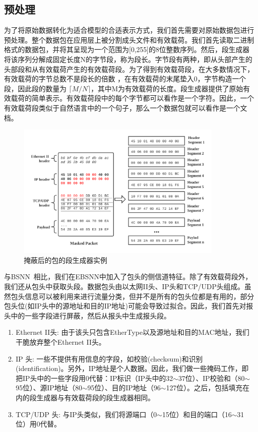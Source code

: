\documentclass[degree=master,cjk-font=noto]{thuthesis}
\begin{document}
\subsection{预处理}
\label{prep}

为了将原始数据转化为适合模型的合适表示方式，我们首先需要对原始数据包进行预处理。整个数据包在应用层上被分割成头文件和有效载荷。我们首先读取二进制格式的数据包，并将其呈现为一个范围为[0,255]的8位整数序列。然后，段生成器将该序列分解成固定长度N的字节段，称为段长。字节段有两种，即从头部产生的头部段和从有效载荷产生的有效载荷段。为了得到有效载荷段，在大多数情况下，有效载荷的字节总数不是段长的倍数 ，在有效载荷的末尾垫入0，字节构造一个段，因此段的数量为 $\lceil M / N \rceil$，其中M为有效载荷的长度。段生成器提供了原始有效载荷的简单表示。有效载荷段中的每个字节都可以看作是一个字符。因此，一个有效载荷段类似于自然语言中的一个句子，那么一个数据包就可以看作是一个文档。

\begin{figure}[!tp]
	\centerline{\includegraphics[width=10cm]{BSNN_Segment.png}}
	\caption{掩蔽后的包的段生成器实例}
	\label{fig2}
\end{figure}

与BSNN~\cite{bsnn}相比，我们在EBSNN中加入了包头的侧信道特征。除了有效载荷段外，我们还从包头中获取头段。数据包头由以太网II头、IP头和TCP/UDP头组成。虽然包头信息可以被利用来进行流量分类，但并不是所有的包头位都是有用的，部分包头位(如IP头中的源地址和目的IP地址)可能会导致过拟合。因此，我们首先对报头中的一些字段进行屏蔽，然后从报头中生成报头段。

\begin{enumerate}
	\item Ethernet II头: 由于该头只包含EtherType以及源地址和目的MAC地址，我们干脆放弃整个Ethernet II头。
	\item IP 头: 一些不提供有用信息的字段，如校验(checksum)和识别(identification)。另外，IP地址是个人数据。因此，我们做一些掩码工作，即把IP头中的一些字段用0代替：IP标识（IP头中的32$\sim$37位）、IP校验和（80$\sim$95位）、源IP地址（80$\sim$95位）、目的IP地址（96$\sim$127位）。之后，包括填充在内的段生成器与有效载荷段的段生成器相同。
	\item TCP/UDP 头: 与IP头类似，我们将源端口（0$\sim$15位）和目的端口（16$\sim$31位）用0代替。
\end{enumerate}
\end{document}
